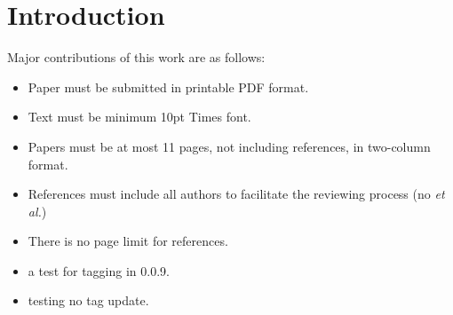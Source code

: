 \section{Introduction}

\vspace{1ex}Major contributions of this work are as follows:

\begin{itemize}
\item Paper must be submitted in printable PDF format.
\item Text must be minimum 10pt Times font.
\item Papers must be at most 11 pages, not including references, in two-column format.
\item References must include all authors to facilitate the reviewing process (no \emph{et al.})
\item There is no page limit for references.
\item a test for tagging in 0.0.9.
\item testing no tag update.
\end{itemize}


